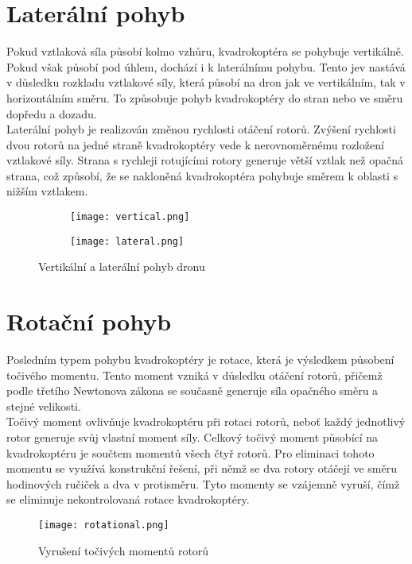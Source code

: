 \documentclass[12pt]{report}
\begin{document}
\section{Laterální pohyb}
Pokud vztlaková síla působí kolmo vzhůru, kvadrokoptéra se pohybuje vertikálně. Pokud však působí pod úhlem, dochází i k laterálnímu pohybu. Tento jev nastává v důsledku rozkladu vztlakové síly, která působí na dron jak ve vertikálním, tak v horizontálním směru. To způsobuje pohyb kvadrokoptéry do stran nebo ve směru dopředu a dozadu.\\
Laterální pohyb je realizován změnou rychlosti otáčení rotorů. Zvýšení rychlosti dvou rotorů na jedné straně kvadrokoptéry vede k nerovnoměrnému rozložení vztlakové síly. Strana s rychleji rotujícími rotory generuje větší vztlak než opačná strana, což způsobí, že se nakloněná kvadrokoptéra pohybuje směrem k oblasti s nižším vztlakem.

\begin{figure}[H]
    \begin{subfigure}{0.45\linewidth}
        \centering
        \texttt{[image: vertical.png]}
    \end{subfigure}
    \hfill
    \begin{subfigure}{0.45\linewidth}
        \texttt{[image: lateral.png]}
    \end{subfigure}
    \caption{Vertikální a laterální pohyb dronu \cite{nasa}}
    \label{fig:batteries}
\end{figure}

\section{Rotační pohyb}
Posledním typem pohybu kvadrokoptéry je rotace, která je výsledkem působení točivého momentu. Tento moment vzniká v důsledku otáčení rotorů, přičemž podle třetího Newtonova zákona se současně generuje síla opačného směru a stejné velikosti.\\
Točivý moment ovlivňuje kvadrokoptéru při rotaci rotorů, neboť každý jednotlivý rotor generuje svůj vlastní moment síly. Celkový točivý moment působící na kvadrokoptéru je součtem momentů všech čtyř rotorů. Pro eliminaci tohoto momentu se využívá konstrukční řešení, při němž se dva rotory otáčejí ve směru hodinových ručiček a dva v protisměru. Tyto momenty se vzájemně vyruší, čímž se eliminuje nekontrolovaná rotace kvadrokoptéry.\\

\begin{figure}[H]
	\centering
	\texttt{[image: rotational.png]}
	\caption{Vyrušení točivých momentů rotorů \cite{nasa}}
	\label{fig:rotational.png}
\end{figure}
\end{document}
